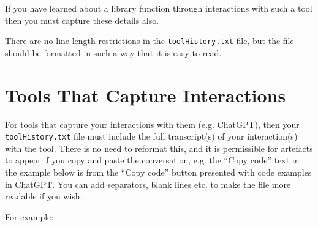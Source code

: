 \documentclass{article}
\begin{document}
If you have learned about a library function through interactions with such a tool then you must capture these details also.

There are no line length restrictions in the \texttt{toolHistory.txt} file,
but the file should be formatted in such a way that it is easy to read. 

\section{Tools That Capture Interactions}

For tools that capture your interactions with them (e.g. ChatGPT), then your \texttt{toolHistory.txt} file must include the full transcript(s) 
of your interaction(s) with the tool. There is no need to reformat this, and it is permissible for artefacts to appear if you copy and 
paste the conversation, e.g. the ``Copy code'' text  in the example below is from the ``Copy code'' button presented with code examples
in ChatGPT. You can add separators, blank lines etc. to make the file more readable if you wish.

For example:
\end{document}
